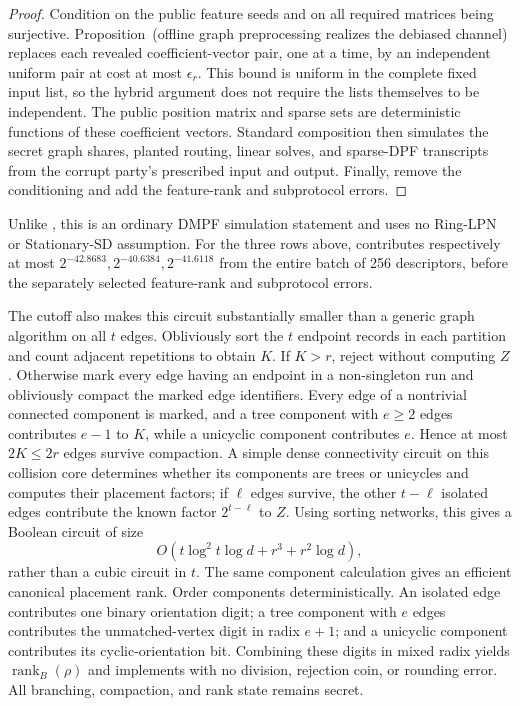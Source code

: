 \begin{proof}
Condition on the public feature seeds and on all required matrices being
surjective.  Proposition~(offline graph preprocessing realizes the debiased
channel) replaces each revealed coefficient-vector pair, one at a time, by
an independent uniform pair at cost at most
$\epsilon_r$.  This bound is uniform in the complete fixed input
list, so the hybrid argument does not require the lists themselves to be
independent.  The public position matrix and sparse sets are deterministic
functions of these coefficient vectors.  Standard composition then simulates
the secret graph shares, planted routing, linear solves, and sparse-DPF
transcripts from the corrupt party's prescribed input and output.  Finally,
remove the conditioning and add the feature-rank and subprotocol errors.
\end{proof}

Unlike , this is an ordinary
DMPF simulation statement and uses no Ring-LPN or Stationary-SD assumption.
For the three rows above, 
contributes respectively at most
$2^{-42.8683},2^{-40.6384},2^{-41.6118}$ from the entire batch of 256
descriptors, before the separately selected feature-rank and subprotocol
errors.

The cutoff also makes this circuit substantially smaller than a generic graph
algorithm on all $t$ edges.  Obliviously sort the $t$ endpoint records in each
partition and count adjacent repetitions to obtain $K$.  If $K>r$, reject
without computing $Z$.  Otherwise mark every edge having an endpoint in a
non-singleton run and obliviously compact the marked edge identifiers.  Every
edge of a nontrivial connected component is marked, and a tree component with
$e\geq2$ edges contributes $e-1$ to $K$, while a unicyclic component
contributes $e$.  Hence at most $2K\leq2r$ edges survive compaction.  A simple
dense connectivity circuit on this collision core determines whether its
components are trees or unicycles and computes their placement factors; if
$\ell$ edges survive, the other $t-\ell$ isolated edges contribute the known
factor $2^{t-\ell}$ to $Z$.  Using sorting networks, this gives a Boolean
circuit of size
\[
 O(t\log^2t\log d+r^3+r^2\log d),
\]
rather than a cubic circuit in $t$.  The same component calculation gives an
efficient canonical placement rank.  Order components deterministically.  An
isolated edge contributes one binary orientation digit; a tree component with
$e$ edges contributes the unmatched-vertex digit in radix $e+1$; and a
unicyclic component contributes its cyclic-orientation bit.  Combining these
digits in mixed radix yields $\operatorname{rank}_B(\rho)$ and implements
 with no division, rejection coin, or
rounding error.  All branching, compaction, and rank state remains secret.

